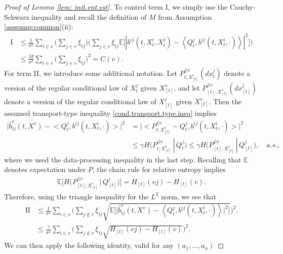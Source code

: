 \documentclass[11pt,reqno]{amsart}
\numberwithin{equation}{section}
\theoremstyle{definition}
\def\CC{{C}}
\def\E{{\mathbb E}}
\begin{document}
\begin{proof}[Proof of Lemma \ref{lem: init.ent.est}]
To control term I, we simply use the Cauchy-Schwarz inequality and recall the definition of $M$ from Assumption \ref{asssump:common}(ii):
		\begin{align} \label{eq:old.treatment.term.I}
			\text{I} & \leq \frac{1}{\sigma^2} \sum_{i \in v} \bigg( \sum_{j \in v } \xi_{ij} \bigg)
			\bigg(\sum_{j \in v } \xi_{ij} \E\Big[\left| b^{ij}(t, X^i_t, X^j_t) - \left<Q^{j}_t, b^{ij}(t, X^i_t, \cdot)\right> \right|^2\Big] \bigg) \\ \nonumber
			& \leq  \frac{M}{\sigma^2} \sum_{i\in v}\bigg( \sum_{j \in v } \xi_{ij}\bigg)^{2} = \CC(v).
		\end{align}
For term II, we introduce some additional notation.  Let $P^{j|v}_{t; X^v_{[t]}} (d x^j_t)$ denote a version of the regular conditional law of $X^j_{t}$ given $X^v_{[t]}$, and let $P^{j|v}_{[t]; X^v_{[t]}}(dx^j_{[t]})$ denote a version of the regular conditional law of $X^j_{[t]}$ given $X^v_{[t]}$. Then the assumed transport-type inequality  \eqref{cond.transport.type.ineq}  implies
		\begin{align*}
			 \big| \widehat{b}^v_{ij} (t,  X^v )- \big< Q^{j}_t, b^{ij}(t, X^i_t, \cdot) \big> \big|^2 &=  \big| \big< P^{j|v}_{t; X^v_{[t]}} - Q^{j}_t, b^{ij}(t, X^i_t, \cdot) \big> \big|^2 \\&  \le \gamma H \big(P^{j|v}_{t; X^v_{[t]}} \, |\, Q^{j}_t \big) \le \gamma H \big(P^{j|v}_{[t]; X^v_{[t]}} \, |\, Q^{j}_{[t]} \big), \quad a.s.,
		\end{align*}
		where we used the data-processing inequality in the last step. 
		Recalling that $\E$ denotes expectation under $P$, the chain rule for relative entropy implies
		\begin{align*}
			\E \big[H \big(P^{j|v}_{[t]; X^v_{[t]}} \, |\, Q^{j}_{[t]} \big)\big] = H_{[t]}(vj) - H_{[t]}(v).
		\end{align*} 
		Therefore, using the triangle inequality for the $L^2$ norm, we see that
		\begin{align} 
			\text{II} &\leq \frac{1}{\sigma^2} \sum_{i \in v} 
			\bigg( \sum_{j \notin v}\xi_{ij} \sqrt{  \E \Big[\Big| \widehat{b}^v_{ij} (t, X^v)- \left\langle Q^{j}_t, b^{ij}(t, X^i_t, \cdot) \right\rangle \Big|^2\Big]} \bigg)^2. \nonumber \\ 
			&\le \frac{\gamma}{\sigma^2} \sum_{i \in v} 
			\bigg( \sum_{j \notin v}\xi_{ij} \sqrt{ H_{[t]}(vj) - H_{[t]}(v) } \bigg)^2. \label{pf:stochcontrol1}
		\end{align}
	We can then apply the following identity, valid for any $(a_1,\ldots,a_n)$

\end{proof}
\end{document}
